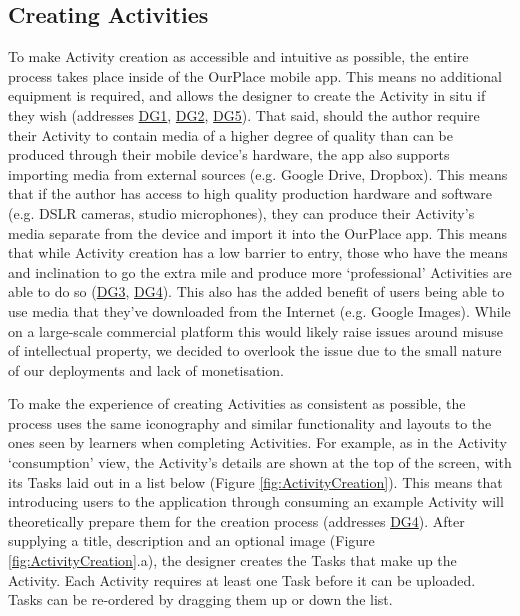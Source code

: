 \subsection{Creating Activities}

To make Activity creation as accessible and intuitive as possible, the entire process takes place inside of the OurPlace mobile app. This means no additional equipment is required, and allows the designer to create the Activity in situ if they wish (addresses \hyperref[DG1]{DG1}, \hyperref[DG2]{DG2}, \hyperref[DG5]{DG5}). That said, should the author require their Activity to contain media of a higher degree of quality than can be produced through their mobile device's hardware, the app also supports importing media from external sources (e.g. Google Drive, Dropbox). This means that if the author has access to high quality production hardware and software (e.g. DSLR cameras, studio microphones), they can produce their Activity's media separate from the device and import it into the OurPlace app. This means that while Activity creation has a low barrier to entry, those who have the means and inclination to go the extra mile and produce more `professional' Activities are able to do so (\hyperref[DG3]{DG3}, \hyperref[DG4]{DG4}). This also has the added benefit of users being able to use media that they've downloaded from the Internet (e.g. Google Images). While on a large-scale commercial platform this would likely raise issues around misuse of intellectual property, we decided to overlook the issue due to the small nature of our deployments and lack of monetisation.

To make the experience of creating Activities as consistent as possible, the process uses the same iconography and similar functionality and layouts to the ones seen by learners when completing Activities. For example, as in the Activity `consumption' view, the Activity's details are shown at the top of the screen, with its Tasks laid out in a list below (Figure \ref{fig:ActivityCreation}). This means that introducing users to the application through consuming an example Activity will theoretically prepare them for the creation process (addresses \hyperref[DG4]{DG4}). After supplying a title, description and an optional image (Figure \ref{fig:ActivityCreation}.a), the designer creates the Tasks that make up the Activity. Each Activity requires at least one Task before it can be uploaded. Tasks can be re-ordered by dragging them up or down the list.

